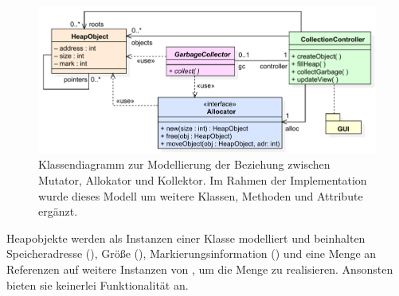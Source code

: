 \begin{figure}[h]
	\centering
	\includegraphics[scale=0.6]{img/uml/ch7-model.pdf}
	\caption[Klassendiagramm zur Modellierung von Mutator, Allokator und Kollektor]{Klassendiagramm zur Modellierung der Beziehung zwischen Mutator, Allokator und Kollektor. Im Rahmen der Implementation wurde dieses Modell um weitere Klassen, Methoden und Attribute ergänzt.}
	\label{fig:model}
\end{figure}

Heapobjekte werden als Instanzen einer Klasse  modelliert und beinhalten Speicheradresse (), Größe (), Markierungsinformation () und eine Menge  an Referenzen auf weitere Instanzen von , um die Menge \Pointers zu realisieren.
Ansonsten bieten sie keinerlei Funktionalität an.

